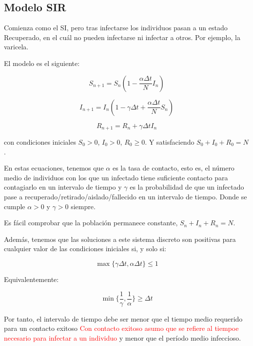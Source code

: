  

\subsection{Modelo SIR}
Comienza como el SI, pero tras infectarse los individuos pasan a un estado Recuperado, en el cuál no pueden infectarse ni infectar a otros.
Por ejemplo, la varicela. 

El modelo es el siguiente:

\begin{equation}
\label{eqn: SIR_modelo_S}
S_{n+1} = S_n \left(1-\frac{\alpha\Delta t}{N} I_n \right)
\end{equation}

\begin{equation}
\label{eqn: SIR_modelo_I}
I_{n+1} = I_n \left( 1-\gamma \Delta t + \frac{\alpha\Delta t}{N} S_n \right)
\end{equation}

\begin{equation}
\label{eqn: SIR_modelo_R}
R_{n+1} = R_n + \gamma \Delta t I_n
\end{equation}

con condiciones iniciales $S_0>0$, $I_0>0$, $R_0\geq 0$. Y satisfaciendo $S_0+I_0+R_0=N$.

En estas ecuaciones, tenemos que $\alpha$ es la tasa de contacto, esto es, el número medio de individuos con los que un infectado tiene suficiente contacto para contagiarlo en un intervalo de tiempo y $\gamma$ es la probabilidad de que un infectado pase a recuperado/retirado/aislado/fallecido en un intervalo de tiempo. Donde se cumple $\alpha >0$ y $\gamma >0$ siempre.

Es fácil comprobar que la población permanece constante, $S_n+I_n+R_n=N$.

Además, tenemos que las soluciones a este sistema discreto son positivas para cualquier valor de las condiciones iniciales si, y solo si:

$$\max{\big\{\gamma\Delta t, \alpha\Delta t\big\} } \leq 1$$

Equivalentemente:

$$\min{\bigg\{ \frac{1}{\gamma}, \frac{1}{\alpha} \bigg\} } \geq \Delta t$$

Por tanto, el intervalo de tiempo debe ser menor que el tiempo medio requerido para un contacto exitoso \textcolor{red}{Con contacto exitoso asumo que se refiere al tiempoe necesario para infectar a un individuo} y menor que el período medio infeccioso.

